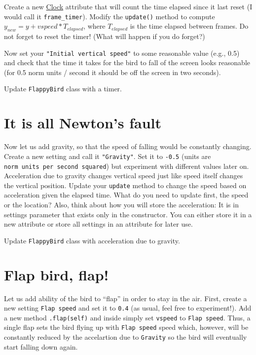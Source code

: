 \documentclass[
]{book}
\begin{document}
Create a new \href{https://psychopy.org/api/clock.html\#psychopy.clock.Clock}{Clock} attribute that will count the time elapsed since it last reset (I would call it \texttt{frame\_timer}). Modify the \texttt{update()} method to compute \(y_{new} = y + vspeed * T_{elapsed}\), where \(T_{elapsed}\) is the time elapsed between frames. Do not forget to reset the timer! (What will happen if you do forget?)

Now set your \texttt{"Initial\ vertical\ speed"} to some reasonable value (e.g., 0.5) and check that the time it takes for the bird to fall of the screen looks reasonable (for 0.5 norm units / second it should be off the screen in two seconds).

Update \texttt{FlappyBird} class with a timer.

\hypertarget{it-is-all-newtons-fault}{%
\section{It is all Newton's fault}\label{it-is-all-newtons-fault}}

Now let us add gravity, so that the speed of falling would be constantly changing. Create a new setting and call it \texttt{"Gravity"}. Set it to \texttt{-0.5} (units are \texttt{norm\ units\ per\ second\ squared}) but experiment with different values later on. Acceleration due to gravity changes vertical speed just like speed itself changes the vertical position. Update your \texttt{update} method to change the speed based on acceleration given the elapsed time. What do you need to update first, the speed or the location? Also, think about how you will store the acceleration: It is in settings parameter that exists only in the constructor. You can either store it in a new attribute or store all settings in an attribute for later use.

Update \texttt{FlappyBird} class with acceleration due to gravity.

\hypertarget{flap-bird-flap}{%
\section{Flap bird, flap!}\label{flap-bird-flap}}

Let us add ability of the bird to ``flap'' in order to stay in the air. First, create a new setting \texttt{Flap\ speed} and set it to \texttt{0.4} (as usual, feel free to experiment!). Add a new method \texttt{.flap(self)} and inside simply set \texttt{vspeed} to \texttt{Flap\ speed}. Thus, a single flap sets the bird flying up with \texttt{Flap\ speed} speed which, however, will be constantly reduced by the accelartion due to \texttt{Gravity} so the bird will eventually start falling down again.
\end{document}
